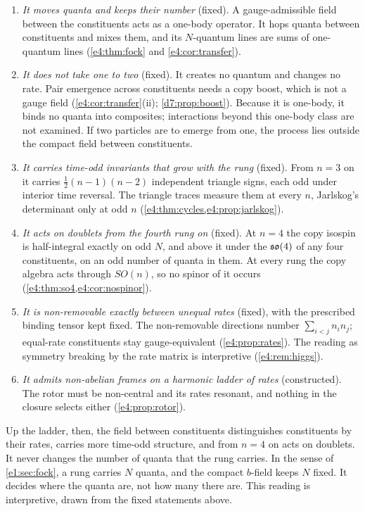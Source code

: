 \begin{remark}
\label{e4:rem:answer}
\begin{enumerate}[label=(\alph*),leftmargin=2.2em]
\item \emph{It moves quanta and keeps their number} (fixed). A gauge-admissible field between the constituents acts as a one-body operator.
It hops quanta between constituents and mixes them, and its $N$-quantum lines are sums of one-quantum lines (\cref{e4:thm:fock} and
\cref{e4:cor:transfer}).
\item \emph{It does not take one to two} (fixed). It creates no quantum and changes no rate. Pair emergence across constituents needs a copy boost,
which is not a gauge field (\cref{e4:cor:transfer}(ii); \cref{d7:prop:boost}). Because it is one-body, it binds no quanta into composites;
interactions beyond this one-body class are not examined.
If two particles are to emerge from one, the process lies outside the compact field between constituents.
\item \emph{It carries time-odd invariants that grow with the rung} (fixed). From $n=3$ on it carries $\tfrac12(n-1)(n-2)$ independent triangle signs, each odd
under interior time reversal. The triangle traces measure them at every $n$, Jarlskog's determinant only at odd $n$
(\cref{e4:thm:cycles,e4:prop:jarlskog}).
\item \emph{It acts on doublets from the fourth rung on} (fixed). At $n=4$ the copy isospin is half-integral exactly on odd $N$, and above it under the
$\mathfrak{so}(4)$ of any four constituents, on an odd number of quanta in them. At every rung the copy algebra acts through $SO(n)$, so no spinor of it
occurs (\cref{e4:thm:so4,e4:cor:nospinor}).
\item \emph{It is non-removable exactly between unequal rates} (fixed), with the prescribed binding tensor kept fixed. The non-removable directions number $\sum_{i<j}n_in_j$; equal-rate constituents stay
gauge-equivalent (\cref{e4:prop:rates}). The reading as symmetry breaking by the rate matrix is interpretive (\cref{e4:rem:higgs}).
\item \emph{It admits non-abelian frames on a harmonic ladder of rates} (constructed). The rotor must be non-central and its rates resonant, and
nothing in the closure selects either (\cref{e4:prop:rotor}).
\end{enumerate}
Up the ladder, then, the field between constituents distinguishes constituents by their rates, carries more time-odd structure, and from
$n=4$ on acts on doublets. It never changes the number of quanta that the rung carries. In the sense of \cref{e1:sec:fock}, a rung carries $N$
quanta, and the compact $b$-field keeps $N$ fixed. It decides where the quanta are, not how many there are. This reading is interpretive, drawn
from the fixed statements above.
\end{remark}

